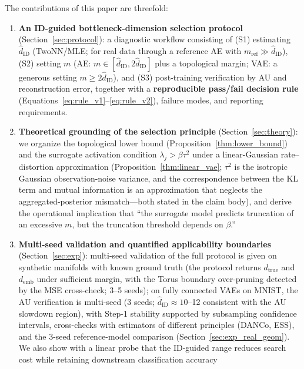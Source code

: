 \documentclass[make,article,submit,pdftex,moreauthors]{Definitions/mdpi}
\newcommand{\hatdID}{\hat{d}_{\mathrm{ID}}}
\newcommand{\dtrue}{d_{\mathrm{true}}}
\newcommand{\demb}{d_{\mathrm{emb}}}
\begin{document}
The contributions of this paper are threefold:
\begin{enumerate}
  \item \textbf{An ID-guided bottleneck-dimension selection protocol}
        (Section~\ref{sec:protocol}):
        a diagnostic workflow consisting of
        (S1) estimating $\hatdID$ (TwoNN/MLE; for real data through a
        reference AE with $m_{\mathrm{ref}} \gg \hatdID$),
        (S2) setting $m$ (AE: $m \in [\hatdID, 2\hatdID]$ plus a topological
        margin; VAE: a generous setting $m \geq 2\hatdID$), and
        (S3) post-training verification by AU and reconstruction error,
        together with a \textbf{reproducible pass/fail decision rule}
        (Equations~\eqref{eq:rule_v1}--\eqref{eq:rule_v2}), failure modes,
        and reporting requirements.
  \item \textbf{Theoretical grounding of the selection principle}
        (Section~\ref{sec:theory}):
        we organize the topological lower bound
        (Proposition~\ref{thm:lower_bound}) and the surrogate activation
        condition $\lambda_j > \beta\tau^2$ under a linear-Gaussian
        rate--distortion approximation (Proposition~\ref{thm:linear_vae};
        $\tau^2$ is the isotropic Gaussian observation-noise variance, and
        the correspondence between the KL term and mutual information is an
        approximation that neglects the aggregated-posterior mismatch---both
        stated in the claim body), and derive the operational implication
        that ``the surrogate model predicts truncation of an excessive $m$,
        but the truncation threshold depends on $\beta$.''
  \item \textbf{Multi-seed validation and quantified applicability
        boundaries} (Section~\ref{sec:exp}):
        multi-seed validation of the full protocol is given on synthetic
        manifolds with known ground truth (the protocol returns $\dtrue$ and
        $\demb$ under sufficient margin, with the Torus boundary
        over-pruning detected by the MSE cross-check; 3--5 seeds); on
        fully connected VAEs on MNIST, the AU verification is multi-seed
        (3 seeds; $\hatdID \approx 10$--12 consistent with the AU slowdown
        region), with Step-1 stability supported by subsampling confidence
        intervals, cross-checks with estimators of different principles
        (DANCo, ESS), and the 3-seed reference-model comparison
        (Section~\ref{sec:exp_real_geom}).
        We also show with a linear probe that the ID-guided range reduces
        search cost while retaining downstream classification accuracy

\end{enumerate}
\end{document}
